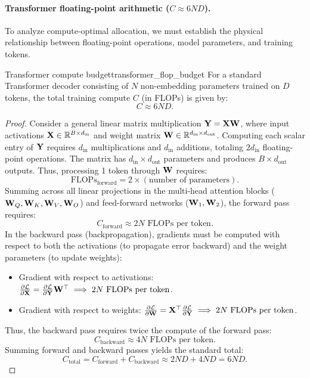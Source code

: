 \documentclass[../../main.tex]{subfiles}
\begin{document}
\paragraph{Transformer floating-point arithmetic ($C \approx 6ND$).}
To analyze compute-optimal allocation, we must establish the physical relationship between floating-point operations, model parameters, and training tokens.

\begin{theorem}{Transformer compute budget}{transformer_flop_budget}
For a standard Transformer decoder consisting of $N$ non-embedding parameters trained on $D$ tokens, the total training compute $C$ (in FLOPs) is given by:
\begin{equation}
\label{eq:6nd_formulation}
C \approx 6 N D.
\end{equation}
\end{theorem}

\begin{proof}
Consider a general linear matrix multiplication $\mathbf{Y} = \mathbf{X} \mathbf{W}$, where input activations $\mathbf{X} \in \mathbb{R}^{B \times d_{\text{in}}}$ and weight matrix $\mathbf{W} \in \mathbb{R}^{d_{\text{in}} \times d_{\text{out}}}$. 
Computing each scalar entry of $\mathbf{Y}$ requires $d_{\text{in}}$ multiplications and $d_{\text{in}}$ additions, totaling $2 d_{\text{in}}$ floating-point operations. The matrix has $d_{\text{in}} \times d_{\text{out}}$ parameters and produces $B \times d_{\text{out}}$ outputs. Thus, processing 1 token through $\mathbf{W}$ requires:
\begin{equation}
\text{FLOPs}_{\text{forward}} = 2 \times (\text{number of parameters}).
\end{equation}
Summing across all linear projections in the multi-head attention blocks ($\mathbf{W}_Q, \mathbf{W}_K, \mathbf{W}_V, \mathbf{W}_O$) and feed-forward networks ($\mathbf{W}_1, \mathbf{W}_2$), the forward pass requires:
\begin{equation}
C_{\text{forward}} \approx 2 N \text{ FLOPs per token}.
\end{equation}
In the backward pass (backpropagation), gradients must be computed with respect to both the activations (to propagate error backward) and the weight parameters (to update weights):
\begin{itemize}
    \item Gradient with respect to activations: $\frac{\partial \mathcal{L}}{\partial \mathbf{X}} = \frac{\partial \mathcal{L}}{\partial \mathbf{Y}} \mathbf{W}^\top \implies 2 N \text{ FLOPs per token}$.
    \item Gradient with respect to weights: $\frac{\partial \mathcal{L}}{\partial \mathbf{W}} = \mathbf{X}^\top \frac{\partial \mathcal{L}}{\partial \mathbf{Y}} \implies 2 N \text{ FLOPs per token}$.
\end{itemize}
Thus, the backward pass requires twice the compute of the forward pass:
\begin{equation}
C_{\text{backward}} \approx 4 N \text{ FLOPs per token}.
\end{equation}
Summing forward and backward passes yields the standard total:
\begin{equation}
C_{\text{total}} = C_{\text{forward}} + C_{\text{backward}} \approx 2 N D + 4 N D = 6 N D.
\end{equation}
\end{proof}
\end{document}
